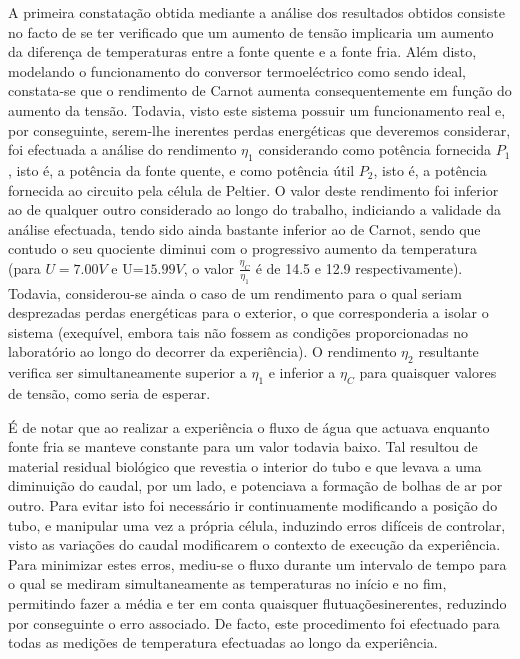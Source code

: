 \documentclass[9pt]{extarticle}
\begin{document}
\begin{multicols}{2}
\par A primeira constatação obtida mediante a análise dos resultados obtidos consiste no facto de se ter verificado que um aumento de tensão implicaria um aumento da diferença de temperaturas entre a fonte quente e a fonte fria. Além disto, modelando o funcionamento do conversor termoeléctrico como sendo ideal, constata-se que o rendimento de Carnot aumenta consequentemente em função do aumento da tensão. Todavia, visto este sistema possuir um funcionamento real e, por conseguinte, serem-lhe inerentes perdas energéticas que deveremos considerar, foi efectuada a análise do rendimento $\eta_1$ considerando como potência fornecida $P_1$, isto é, a potência da fonte quente, e como potência útil $P_2$, isto é, a potência fornecida ao circuito pela célula de Peltier. O valor deste rendimento foi inferior ao de qualquer outro considerado ao longo do trabalho, indiciando a validade da análise efectuada, tendo sido ainda bastante inferior ao de Carnot, sendo que contudo o seu quociente diminui com o progressivo aumento da temperatura (para $U=7.00V$ e U=$15.99V$, o valor $\frac{\eta_C}{\eta_1}$ é de 14.5 e 12.9 respectivamente). Todavia, considerou-se ainda o caso de um rendimento para o qual seriam desprezadas perdas energéticas para o exterior, o que corresponderia a isolar o sistema (exequível, embora tais não fossem as condições proporcionadas no laboratório ao longo do decorrer da experiência). O rendimento $\eta_2$ resultante verifica ser simultaneamente superior a $\eta_1$ e inferior a $\eta_C$ para quaisquer valores de tensão, como seria de esperar.

\par É de notar que ao realizar a experiência o fluxo de água que actuava enquanto fonte fria se manteve constante para um valor todavia baixo. Tal resultou de material residual biológico que revestia o interior do tubo e que levava a uma diminuição do caudal, por um lado, e potenciava a formação de bolhas de ar por outro. Para evitar isto foi necessário ir continuamente modificando a posição do tubo, e manipular uma vez a própria célula, induzindo erros difíceis de controlar, visto as variações do caudal modificarem o contexto de execução da experiência. Para minimizar estes erros, mediu-se o fluxo durante um intervalo de tempo para o qual se mediram simultaneamente as temperaturas no início e no fim, permitindo fazer a média e ter em conta quaisquer flutuaçõesinerentes, reduzindo por conseguinte o erro associado. De facto, este procedimento foi efectuado para todas as medições de temperatura efectuadas ao longo da experiência.


\end{multicols}
\end{document}
